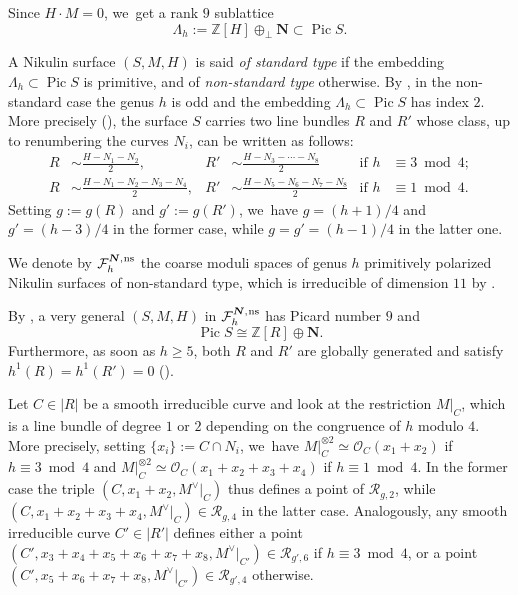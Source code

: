 \documentclass[JEP,XML,SOM,Unicode,NoEqCountersInSection,published]{cedram}
\newcommand{\ns}{{\mkern1mu\mathrm{ns}}}
\newcommand{\bN}{\boldsymbol{N}}
\theoremstyle{plain}
\theoremstyle{definition}
\DeclareMathOperator{\Pic}{Pic}
\newcommand\ZZ{{\mathbb Z}}
\newcommand\F{{\mathcal F}}
\newcommand\R{{\mathcal R}}
\let\+\oplus
\begin{document}
Since $H\cdot M=0$, we~get a rank $9$ sublattice
\[
 \Lambda_h:= \ZZ[H] \+_{\perp} \bN \subset \Pic S.
\]

A Nikulin surface $(S,M,H)$ is said {\it of standard type} if the embedding $\Lambda_h \subset \Pic S$ is primitive, and of {\it non-standard type} otherwise. By \cite[Prop.\,2.2]{vGS}, in the non-standard case the genus $h$ is odd and the embedding $\Lambda_h \subset \Pic S$ has index $2$. More precisely (\cf \cite[Prop.\,2.1 \& Cor.\,2.1]{GS}), the surface $S$ carries two line bundles $R$ and $R'$ whose class, up to renumbering the curves $N_i$, can be written as follows:
\begin{align*}
R&\sim \frac{H-N_1-N_2}{2},&R'&\sim\frac{H-N_3-\cdots-N_8 }{2}&\text{if } h &\equiv 3 \bmod 4;
\\
R&\sim \frac{H-N_1-N_2-N_3-N_4}{2},&R'&\sim \frac{H-N_5-N_6-N_7-N_8}{2}&\text{if } h &\equiv 1 \bmod 4.
\end{align*}
Setting $g:=g(R)$ and $g':=g(R')$, we~have $g=(h+1)/4$ and $g'=(h-3)/4$ in the former case, while $g=g'=(h-1)/4$ in the latter one.

We denote by $\F_h^{\bN,\ns}$ the coarse moduli spaces of genus $h$ primitively polarized Nikulin surfaces of non-standard type, which is irreducible of dimension $11$ by \hbox{\cite[\S 3]{Do}}.

By \cite[Prop.\,2.1 \& Cor.\,2.1]{GS}, a very general $(S,M,H)$ in $\F_h^{\bN,\ns}$ has Picard number $9$ and
\begin{equation}
\label{eq:pic9}
\Pic S \cong \ZZ[R] \+ \bN.
\end{equation}
Furthermore, as soon as $h\geq 5$, both $R$ and $R'$ are globally generated and satisfy $h^1(R)=h^1(R')=0$ (\cf \cite[Prop.\,2.3(i)]{KLV2}).

Let $C\in |R|$ be a smooth irreducible curve and look at the restriction $M|_C$, which is a line bundle of degree $1$ or $2$ depending on the congruence of $h$ modulo $4$. More precisely, setting $\{x_i\}:=C\cap N_i$, we~have $M|_C^{\otimes 2}\simeq \mathcal O_C(x_1+x_2)$ if $h \equiv 3 \bmod 4$ and $M|_C^{\otimes 2}\simeq \mathcal O_C(x_1+x_2+x_3+x_4)$ if $h \equiv 1 \bmod 4$. In the former case the triple $(C,x_1+x_2,M^\vee|_C)$ thus defines a point of $\mathcal R_{g,2}$, while $(C,x_1+x_2+x_3+x_4,M^\vee|_C)\in\mathcal R_{g,4}$ in the latter case. Analogously, any smooth irreducible curve $C'\in |R'|$ defines either a point $(C', x_3+x_4+x_5+x_6+x_7+x_8,M^\vee|_{C'})\in \mathcal R_{g',6}$ if $h \equiv 3 \bmod 4$, or a point $(C',x_5+x_6+x_7+x_8,M^\vee|_{C'})\in\R_{g',4}$ otherwise.
\end{document}
